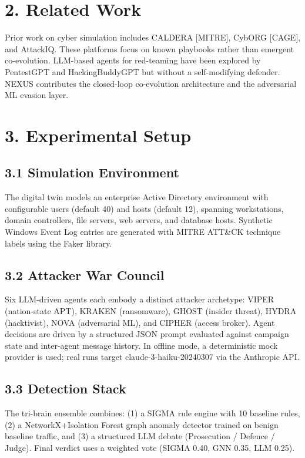 \documentclass{article}
\begin{document}
\section{2. Related Work}

Prior work on cyber simulation includes CALDERA [MITRE], CybORG [CAGE], and AttackIQ. These platforms focus on known playbooks rather than emergent co-evolution. LLM-based agents for red-teaming have been explored by PentestGPT and HackingBuddyGPT but without a self-modifying defender. NEXUS contributes the closed-loop co-evolution architecture and the adversarial ML evasion layer.



\section{3. Experimental Setup}


\subsection{3.1 Simulation Environment}

The digital twin models an enterprise Active Directory environment with configurable users (default 40) and hosts (default 12), spanning workstations, domain controllers, file servers, web servers, and database hosts. Synthetic Windows Event Log entries are generated with MITRE ATT\&CK technique labels using the Faker library.


\subsection{3.2 Attacker War Council}

Six LLM-driven agents each embody a distinct attacker archetype: VIPER (nation-state APT), KRAKEN (ransomware), GHOST (insider threat), HYDRA (hacktivist), NOVA (adversarial ML), and CIPHER (access broker). Agent decisions are driven by a structured JSON prompt evaluated against campaign state and inter-agent message history. In offline mode, a deterministic mock provider is used; real runs target claude-3-haiku-20240307 via the Anthropic API.


\subsection{3.3 Detection Stack}

The tri-brain ensemble combines: (1) a SIGMA rule engine with 10 baseline rules, (2) a NetworkX+Isolation Forest graph anomaly detector trained on benign baseline traffic, and (3) a structured LLM debate (Prosecution / Defence / Judge). Final verdict uses a weighted vote (SIGMA 0.40, GNN 0.35, LLM 0.25).
\end{document}

